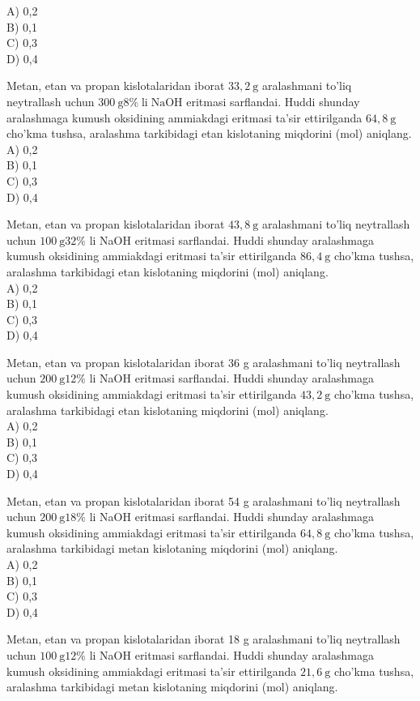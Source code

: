 A) 0,2\\
B) 0,1\\
C) 0,3\\
D) 0,4
  \item Metan, etan va propan kislotalaridan iborat $33,2 \mathrm{~g}$ aralashmani to'liq\\
neytrallash uchun $300 \mathrm{~g} 8 \% \operatorname{li} \mathrm{NaOH}$ eritmasi sarflandai. Huddi shunday aralashmaga kumush oksidining ammiakdagi eritmasi ta'sir ettirilganda $64,8 \mathrm{~g}$ cho'kma tushsa, aralashma tarkibidagi etan kislotaning miqdorini (mol) aniqlang.\\
A) 0,2\\
B) 0,1\\
C) 0,3\\
D) 0,4
  \item Metan, etan va propan kislotalaridan iborat $43,8 \mathrm{~g}$ aralashmani to'liq neytrallash uchun $100 \mathrm{~g} 32 \%$ li NaOH eritmasi sarflandai. Huddi shunday aralashmaga kumush oksidining ammiakdagi eritmasi ta'sir ettirilganda $86,4 \mathrm{~g}$ cho'kma tushsa, aralashma tarkibidagi etan kislotaning miqdorini (mol) aniqlang.\\
A) 0,2\\
B) 0,1\\
C) 0,3\\
D) 0,4
  \item Metan, etan va propan kislotalaridan iborat 36 g aralashmani to'liq neytrallash uchun $200 \mathrm{~g} 12 \%$ li NaOH eritmasi sarflandai. Huddi shunday aralashmaga kumush oksidining ammiakdagi eritmasi ta'sir ettirilganda $43,2 \mathrm{~g}$ cho'kma tushsa, aralashma tarkibidagi etan kislotaning miqdorini (mol) aniqlang.\\
A) 0,2\\
B) 0,1\\
C) 0,3\\
D) 0,4
  \item Metan, etan va propan kislotalaridan iborat 54 g aralashmani to'liq neytrallash uchun $200 \mathrm{~g} 18 \%$ li NaOH eritmasi sarflandai. Huddi shunday aralashmaga kumush oksidining ammiakdagi eritmasi ta'sir ettirilganda $64,8 \mathrm{~g}$ cho'kma tushsa, aralashma tarkibidagi metan kislotaning miqdorini (mol) aniqlang.\\
A) 0,2\\
B) 0,1\\
C) 0,3\\
D) 0,4
  \item Metan, etan va propan kislotalaridan iborat 18 g aralashmani to'liq neytrallash uchun $100 \mathrm{~g} 12 \%$ li NaOH eritmasi sarflandai. Huddi shunday aralashmaga kumush oksidining ammiakdagi eritmasi ta'sir ettirilganda $21,6 \mathrm{~g}$ cho'kma tushsa, aralashma tarkibidagi metan kislotaning miqdorini (mol) aniqlang.\\
